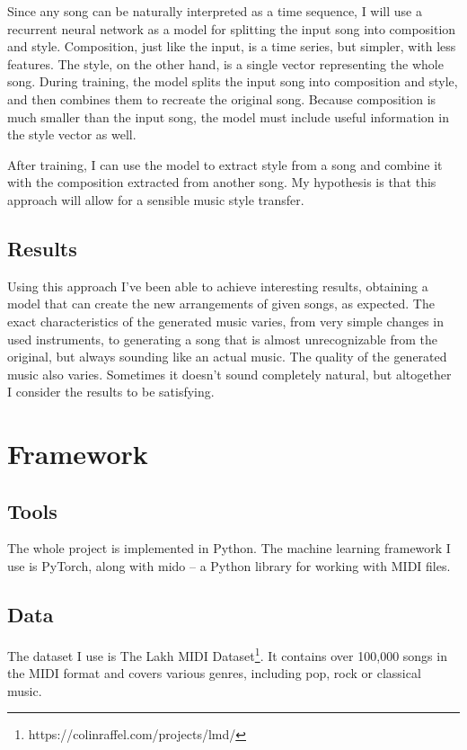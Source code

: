\documentclass[en]{pracamgr}
\begin{document}
Since any song can be naturally interpreted as a time sequence, I will use a recurrent neural network as a model for splitting the input song into composition and style.
Composition, just like the input, is a time series, but simpler, with less features.
The style, on the other hand, is a single vector representing the whole song.
During training, the model splits the input song into composition and style, and then combines them to recreate the original song.
Because composition is much smaller than the input song, the model must include useful information in the style vector as well.

After training, I can use the model to extract style from a song and combine it with the composition extracted from another song.
My hypothesis is that this approach will allow for a sensible music style transfer.

\section{Results}

Using this approach I've been able to achieve interesting results, obtaining a model that can create the new arrangements of given songs, as expected.
The exact characteristics of the generated music varies, from very simple changes in used instruments, to generating a song that is almost unrecognizable from the original, but always sounding like an actual music.
The quality of the generated music also varies. Sometimes it doesn't sound completely natural, but altogether I consider the results to be satisfying.

\chapter{Framework}

\section{Tools}

The whole project is implemented in Python.
The machine learning framework I use is PyTorch, along with mido -- a Python library for working with MIDI files.

\section{Data}

The dataset I use is The Lakh MIDI Dataset\footnote{https://colinraffel.com/projects/lmd/}.
It contains over 100,000 songs in the MIDI format and covers various genres, including pop, rock or classical music.
\end{document}
